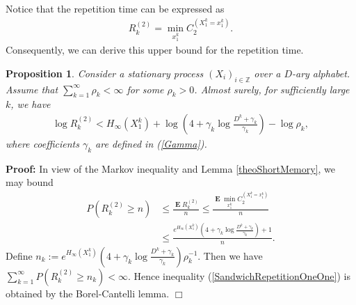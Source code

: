 \documentclass[a4paper,12pt]{article}
\newcommand{\okra}[1]{\left( #1 \right)}
\DeclareMathOperator{\mean}{\mathbf{E}}
\newtheorem{proposition}{Proposition}
\newenvironment*{proof}{\begin{trivlist}\item[]
\noindent\textbf{Proof:}}{$\Box$\par\end{trivlist}}
\begin{document}
Notice that the repetition time can be expressed as
\begin{align}
  R^{(2)}_k=\min_{x_1^k} C^{(X_1^k=x_1^k)}_2.
\end{align}
Consequently, we can derive this upper bound for the repetition time.
\begin{proposition}
  \label{theoSandwichRepetitionOneOne}
  Consider a stationary process $(X_i)_{i\in\mathbb{Z}}$ over a
  $D$-ary alphabet.  Assume that $\sum_{k=1}^\infty \rho_k<\infty$ for
  some $\rho_k>0$.  Almost surely, for sufficiently large $k$, we have
  \begin{align}
    \label{SandwichRepetitionOneOne}
    \log R^{(2)}_k<H_\infty(X_1^k)+\log
    \okra{4+\gamma_k\log\frac{D^k+\gamma_k}{\gamma_k}}
    -\log\rho_k
    ,
  \end{align}
  where coefficients $\gamma_k$ are defined in (\ref{Gamma}).
\end{proposition}
\begin{proof}
  In view of the Markov inequality and Lemma \ref{theoShortMemory},
  we may bound
  \begin{align}
    P(R^{(2)}_k\ge n)
    &\le \frac{\mean R^{(2)}_k}{n}
      \le \frac{\mean \min_{x_1^k} C^{(X_1^k=x_1^k)}_2}{n}
      \nonumber\\
     &\le \frac{e^{H_\infty(X_1^k)}
      \okra{4+\gamma_k\log\frac{D^k+\gamma_k}{\gamma_k}}+1}{n}.
  \end{align}
  Define
  $n_k:=e^{H_\infty(X_1^k)}
  \okra{4+\gamma_k\log\frac{D^k+\gamma_k}{\gamma_k}}\rho_k^{-1}$. Then
  we have $\sum_{k=1}^\infty P(R^{(2)}_k\ge n_k)<\infty$. Hence
  inequality (\ref{SandwichRepetitionOneOne}) is obtained by the
  Borel-Cantelli lemma.
\end{proof}
\end{document}
